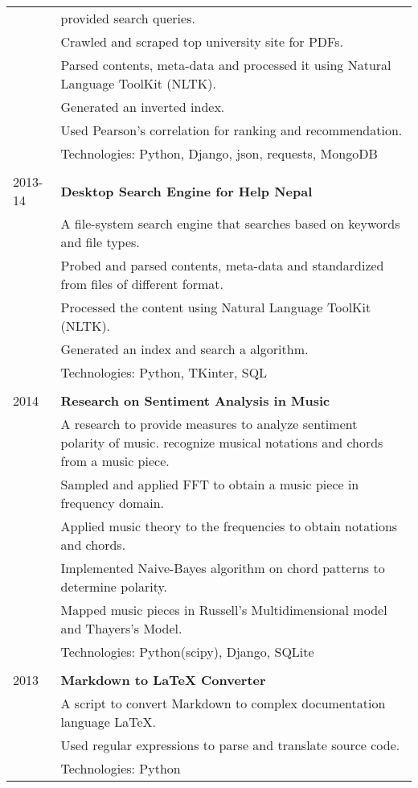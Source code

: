 \documentclass[letterpaper,10pt,oneside]{article}
\newcommand{\nextitem}{\par\hspace*{\labelsep}\textbullet\hspace*{\labelsep}}
\begin{document}
\begin{tabular}{l l}
         & provided search queries. \\
         & \footnotesize{\nextitem Crawled and scraped top university site for PDFs.} \\
         & \footnotesize{\nextitem Parsed contents, meta-data and processed it using Natural Language ToolKit (NLTK).} \\
         & \footnotesize{\nextitem Generated an inverted index.} \\
         & \footnotesize{\nextitem Used Pearson's correlation for ranking and recommendation.} \\
         & Technologies: Python, Django, json, requests, MongoDB \\
         \\
 2013-14 & \textbf{Desktop Search Engine for Help Nepal} \\
         & A file-system search engine that searches based on keywords and file types. \\
         & \footnotesize{\nextitem Probed and parsed contents, meta-data and standardized from files of different format.} \\
         & \footnotesize{\nextitem Processed the content using Natural Language ToolKit (NLTK).} \\
         & \footnotesize{\nextitem Generated an index and search a algorithm.} \\
         & Technologies: Python, TKinter, SQL \\
         \\
 2014    & \textbf{Research on Sentiment Analysis in Music} \\
         & A research to provide measures to analyze sentiment polarity of music. recognize musical notations and chords from a music piece. \\
         & \footnotesize{\nextitem Sampled and applied FFT to obtain a music piece in frequency domain.} \\
         & \footnotesize{\nextitem Applied music theory to the frequencies to obtain notations and chords.} \\
         & \footnotesize{\nextitem Implemented Naive-Bayes algorithm on chord patterns to determine polarity.} \\
         & \footnotesize{\nextitem Mapped music pieces in Russell’s Multidimensional model and Thayers’s Model.} \\
         & Technologies: Python(scipy), Django, SQLite \\
         \\
 2013    & \textbf{Markdown to LaTeX Converter} \\
         & A script to convert Markdown to complex documentation language LaTeX. \\
         & \footnotesize{\nextitem Used regular expressions to parse and translate source code.} \\
         & Technologies: Python \\

\end{tabular}
\end{document}
